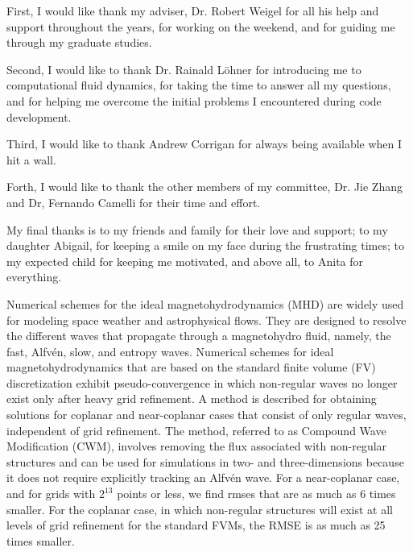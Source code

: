 \documentclass[11pt]{report}
\begin{document}

\acknowledgementspage

\noindent First, I would like thank my adviser, Dr. Robert Weigel for all his help and support throughout the years, for working on the weekend, and for guiding me through my graduate studies. 

Second, I would like to thank Dr. Rainald L{\"o}hner for introducing me to computational fluid dynamics, for taking the time to answer all my questions, and for helping me overcome the initial problems I encountered during code development.  

Third, I would like to thank Andrew Corrigan for always being available when I hit a wall.

Forth, I would like to thank the other members of my committee, Dr. Jie Zhang and Dr, Fernando Camelli for their time and effort. 
 
My final thanks is to my friends and family for their love and support; to my daughter Abigail, for keeping a smile on my face during the frustrating times; to my expected child for keeping me motivated, and above all, to Anita for everything.


\tableofcontents

\listoftables

\listoffigures

\abstractpage

Numerical schemes for the ideal magnetohydrodynamics (MHD) are widely used for modeling space weather and astrophysical flows.  They are designed to resolve the different waves that propagate through a magnetohydro fluid, namely, the fast, Alfv{\'e}n, slow, and entropy waves.  Numerical schemes for ideal magnetohydrodynamics that are based on the standard finite volume (FV) discretization exhibit pseudo-convergence in which non-regular waves no longer exist only after heavy grid refinement.  A method is described for obtaining solutions for coplanar and near-coplanar cases that consist of only regular waves, independent of grid refinement.  The method, referred to as Compound Wave Modification (CWM), involves removing the flux associated with non-regular structures and can be used for simulations in two- and three-dimensions because it does not require explicitly tracking an Alfv{\'e}n wave.  For a near-coplanar case, and for grids with $2^{13}$ points or less, we find \glspl{rmse} that are as much as 6 times smaller.  For the coplanar case, in which non-regular structures will exist at all levels of grid refinement for the standard FVMs, the RMSE is as much as 25 times smaller.  
 
\end{document}
